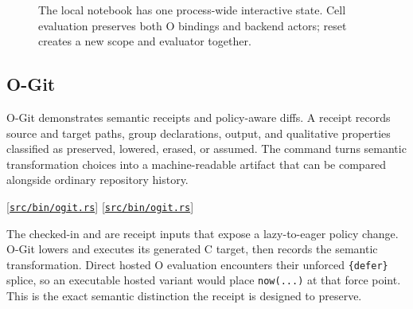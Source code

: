\documentclass[11pt,oneside]{article}
\newcommand{\src}[1]{\textcolor{OSlate}{\scriptsize[\href{https://github.com/lostadi/OSTADIX/blob/c0b02c326b2329a95ba52447c7180bc93957cd57/#1}{\nolinkurl{#1}}]}\allowbreak}
\begin{document}
\begin{figure}[htbp]
\centering
{}
\caption{The local notebook has one process-wide interactive state. Cell
evaluation preserves both O bindings and backend actors; reset creates a new
scope and evaluator together.}
\label{fig:notebook-state}
\end{figure}

\subsection{O-Git}

O-Git demonstrates semantic receipts and policy-aware diffs. A receipt records
source and target paths, group declarations, output, and qualitative
properties classified as preserved, lowered, erased, or assumed. The command
turns semantic transformation choices into a machine-readable artifact that
can be compared alongside ordinary repository history.
\par\src{src/bin/ogit.rs}\quad
\src{src/bin/ogit.rs}

The checked-in  and
 are receipt inputs that expose a lazy-to-eager policy
change. O-Git lowers and executes its generated C target, then records the
semantic transformation. Direct hosted O evaluation encounters their
unforced \texttt{\{defer\}} splice, so an executable hosted variant would place
\texttt{now(...)} at that force point. This is the exact semantic distinction
the receipt is designed to preserve.
\end{document}
